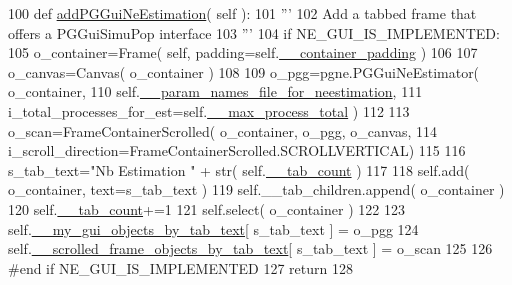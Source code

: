 \begin{DoxyCode}
100     \textcolor{keyword}{def }\hyperlink{classnegui_1_1pghostnotebook_1_1PGHostNotebook_a9242f6b6eff030ac5de8db425e1585f9}{addPGGuiNeEstimation}( self ):
101         \textcolor{stringliteral}{'''}
102 \textcolor{stringliteral}{        Add a tabbed frame that offers a PGGuiSimuPop interface}
103 \textcolor{stringliteral}{        '''}
104         \textcolor{keywordflow}{if} NE\_GUI\_IS\_IMPLEMENTED:
105             o\_container=Frame( self, padding=self.\hyperlink{classnegui_1_1pghostnotebook_1_1PGHostNotebook_a790570fc06951c4ccc142a26c01668ef}{\_\_container\_padding} )
106 
107             o\_canvas=Canvas( o\_container )
108 
109             o\_pgg=pgne.PGGuiNeEstimator( o\_container, 
110                             self.\hyperlink{classnegui_1_1pghostnotebook_1_1PGHostNotebook_a38f70ee82a0a2852953b964623a4c871}{\_\_param\_names\_file\_for\_neestimation},
111                             i\_total\_processes\_for\_est=self.\hyperlink{classnegui_1_1pghostnotebook_1_1PGHostNotebook_a14287e3e1cf5c33d9be0ff28d031fc04}{\_\_max\_process\_total} )
112 
113             o\_scan=FrameContainerScrolled( o\_container, o\_pgg, o\_canvas, 
114             i\_scroll\_direction=FrameContainerScrolled.SCROLLVERTICAL)
115 
116             s\_tab\_text=\textcolor{stringliteral}{"Nb Estimation "} + str( self.\hyperlink{classnegui_1_1pghostnotebook_1_1PGHostNotebook_a84a7417cc57500cbe5c230449ba464b3}{\_\_tab\_count} )
117 
118             self.add( o\_container, text=s\_tab\_text )
119             self.\_\_tab\_children.append( o\_container )
120             self.\hyperlink{classnegui_1_1pghostnotebook_1_1PGHostNotebook_a84a7417cc57500cbe5c230449ba464b3}{\_\_tab\_count}+=1
121             self.select( o\_container )
122 
123             self.\hyperlink{classnegui_1_1pghostnotebook_1_1PGHostNotebook_af4966fb6fc80c08cd38bf21b2c723364}{\_\_my\_gui\_objects\_by\_tab\_text}[ s\_tab\_text ] = o\_pgg 
124             self.\hyperlink{classnegui_1_1pghostnotebook_1_1PGHostNotebook_a5f9ed267b317c56e1da89ef894a2b52a}{\_\_scrolled\_frame\_objects\_by\_tab\_text}[ s\_tab\_text ] = 
      o\_scan
125 
126         \textcolor{comment}{#end if NE\_GUI\_IS\_IMPLEMENTED}
127         \textcolor{keywordflow}{return}
128 
\end{DoxyCode}
